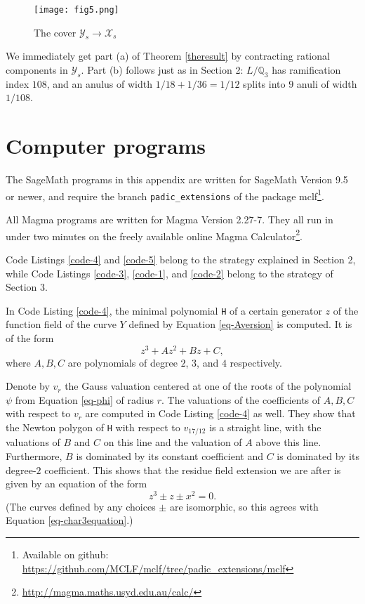 \documentclass[11pt]{amsart}
\newcommand{\BQ}{{\mathbb{Q}}}
\newcommand{\CX}{{\mathcal X}}
\newcommand{\CY}{{\mathcal Y}}
\theoremstyle{definition}
\begin{document}
\begin{figure}[!htb]
\centering
\texttt{[image: fig5.png]}
\caption{The cover $\CY_s\to\CX_s$}
\label{fig-5}
\end{figure}

We immediately get part (a) of Theorem \ref{theresult} by contracting rational components in $\CY_s$. Part (b) follows just as in Section 2: $L/\BQ_3$ has ramification index $108$, and an anulus of width $1/18+1/36=1/12$ splits into $9$ anuli of width $1/108$.







\appendix

\section{Computer programs}

The SageMath programs in this appendix are written for SageMath Version 9.5 or newer, and require the branch \texttt{padic\_extensions} of the package mclf\footnote{Available on github: \href{https://github.com/MCLF/mclf/tree/padic_extensions/mclf}{https://github.com/MCLF/mclf/tree/padic\_extensions/mclf}}.

All Magma programs are written for Magma Version 2.27-7. They all run in under two minutes on the freely available online Magma Calculator\footnote{\href{http://magma.maths.usyd.edu.au/calc/}{http://magma.maths.usyd.edu.au/calc/}}.

Code Listings \ref{code-4} and \ref{code-5} belong to the strategy explained in Section 2, while Code Listings \ref{code-3}, \ref{code-1}, and \ref{code-2} belong to the strategy of Section 3.

In Code Listing \ref{code-4}, the minimal polynomial \texttt{H} of a certain generator $z$ of the function field of the curve $Y$ defined by Equation \eqref{eq-Aversion} is computed. It is of the form
\begin{equation}\label{eq-tameParameter}
z^3+Az^2+Bz+C,
\end{equation}
where $A,B,C$ are polynomials of degree $2$, $3$, and $4$ respectively.

Denote by $v_r$ the Gauss valuation centered at one of the roots of the polynomial $\psi$ from Equation \nolinebreak \eqref{eq-phi} of radius $r$. The valuations of the coefficients of $A,B,C$ with respect to $v_r$ are computed in Code Listing \ref{code-4} as well. They show that the Newton polygon of \texttt{H} with respect to $v_{17/12}$ is a straight line, with the valuations of $B$ and $C$ on this line and the valuation of $A$ above this line. Furthermore, $B$ is dominated by its constant coefficient and $C$ is dominated by its degree-$2$ coefficient. This shows that the residue field extension we are after is given by an equation of the form
\begin{equation*}
z^3\pm z\pm x^2=0.
\end{equation*}
(The curves defined by any choices $\pm$ are isomorphic, so this agrees with Equation \eqref{eq-char3equation}.)
\end{document}
